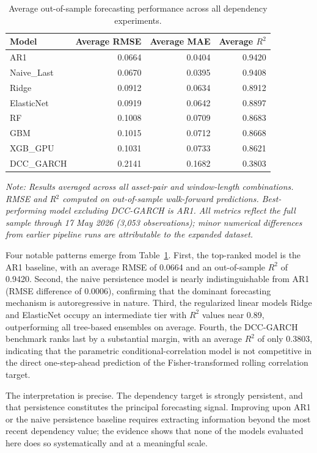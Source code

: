 \begin{table}[H]
    \centering
    \caption{Average out-of-sample forecasting performance across all dependency experiments.}
    \label{tab:model_ranking_summary}
    \begin{tabular}{lrrr}
        \toprule
        Model & Average RMSE & Average MAE & Average $R^2$ \\
        \midrule
        AR1 & 0.0664 & 0.0404 & 0.9420 \\
        Naive\_Last & 0.0670 & 0.0395 & 0.9408 \\
        Ridge & 0.0912 & 0.0634 & 0.8912 \\
        ElasticNet & 0.0919 & 0.0642 & 0.8897 \\
        RF & 0.1008 & 0.0709 & 0.8683 \\
        GBM & 0.1015 & 0.0712 & 0.8668 \\
        XGB\_GPU & 0.1031 & 0.0733 & 0.8621 \\
        DCC\_GARCH & 0.2141 & 0.1682 & 0.3803 \\
        \bottomrule
    \end{tabular}
    \par\smallskip\noindent\footnotesize{\textit{Note: Results averaged across all asset-pair and window-length combinations. RMSE and R$^2$ computed on out-of-sample walk-forward predictions. Best-performing model excluding DCC-GARCH is AR1. All metrics reflect the full sample through 17 May 2026 (3{,}053 observations); minor numerical differences from earlier pipeline runs are attributable to the expanded dataset.}}
\end{table}

Four notable patterns emerge from Table~\ref{tab:model_ranking_summary}. First, the top-ranked model is the AR1 baseline, with an average RMSE of 0.0664 and an out-of-sample $R^2$ of 0.9420. Second, the naive persistence model is nearly indistinguishable from AR1 (RMSE difference of 0.0006), confirming that the dominant forecasting mechanism is autoregressive in nature. Third, the regularized linear models Ridge and ElasticNet occupy an intermediate tier with $R^2$ values near 0.89, outperforming all tree-based ensembles on average. Fourth, the DCC-GARCH benchmark ranks last by a substantial margin, with an average $R^2$ of only 0.3803, indicating that the parametric conditional-correlation model is not competitive in the direct one-step-ahead prediction of the Fisher-transformed rolling correlation target.

The interpretation is precise. The dependency target is strongly persistent, and that persistence constitutes the principal forecasting signal. Improving upon AR1 or the naive persistence baseline requires extracting information beyond the most recent dependency value; the evidence shows that none of the models evaluated here does so systematically and at a meaningful scale.

